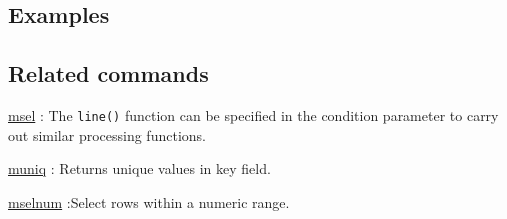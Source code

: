 \subsection*{Examples}


\subsection*{Related commands}

\hyperref[sect:msel]{msel} : The \verb|line()| function can be specified in the condition parameter to carry out similar processing functions. 

\hyperref[sect:muniq]{muniq} : Returns unique values in key field.

\hyperref[sect:mselnum]{mselnum} :Select rows within a numeric range. 

%
